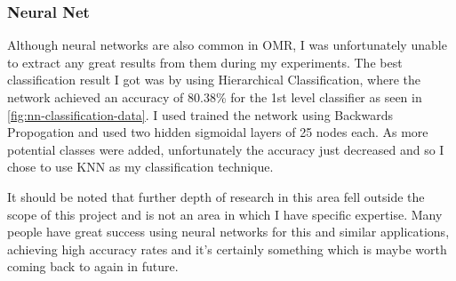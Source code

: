 \subsubsection{Neural Net}

Although neural networks are also common in OMR, I was unfortunately unable to extract any great results from them during my experiments. The best classification result I got was by using Hierarchical Classification, where the network achieved an accuracy of 80.38\% for the 1st level classifier as seen in \cref{fig:nn-classification-data}. I used trained the network using Backwards Propogation and used two hidden sigmoidal layers of 25 nodes each.
As more potential classes were added, unfortunately the accuracy just decreased and so I chose to use KNN as my classification technique.

It should be noted that further depth of research in this area fell outside the scope of this project and is not an area in which I have specific expertise. Many people have great success using neural networks for this and similar applications, achieving high accuracy rates and it's certainly something which is maybe worth coming back to again in future.

